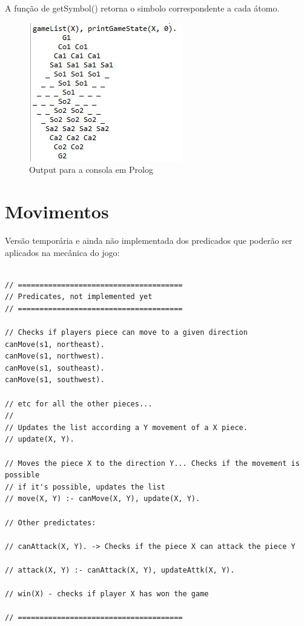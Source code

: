 \documentclass[a4paper]{article}
\begin{document}
A função de getSymbol() retorna o simbolo correspondente a cada átomo.

\begin{figure}[h!]
\begin{center}
\includegraphics[scale=0.7]{img/output.jpg}
\caption{Output para a consola em Prolog}
\label{fig:7}
\end{center}
\end{figure}

\newpage

\section{Movimentos}

Versão temporária e ainda não implementada dos predicados que poderão ser aplicados na mecânica do jogo:

\begin{lstlisting}

// ======================================
// Predicates, not implemented yet
// ======================================

// Checks if players piece can move to a given direction
canMove(s1, northeast).
canMove(s1, northwest).
canMove(s1, southeast).
canMove(s1, southwest).

// etc for all the other pieces...
//
// Updates the list according a Y movement of a X piece.
// update(X, Y).

// Moves the piece X to the direction Y... Checks if the movement is possible 
// if it's possible, updates the list
// move(X, Y) :- canMove(X, Y), update(X, Y).

// Other predictates:

// canAttack(X, Y). -> Checks if the piece X can attack the piece Y

// attack(X, Y) :- canAttack(X, Y), updateAttk(X, Y).

// win(X) - checks if player X has won the game

// ====================================== 

\end{lstlisting}
\end{document}
